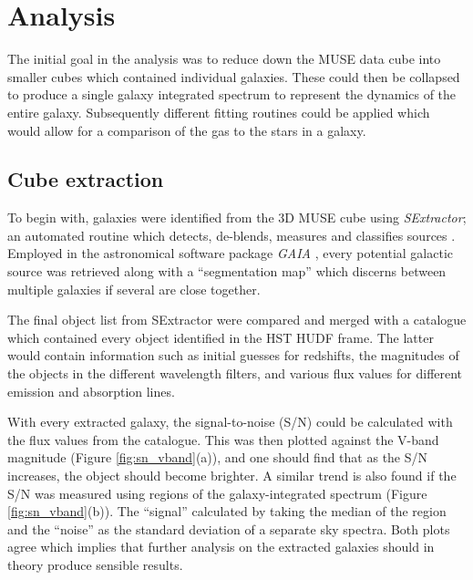 \documentclass[12pt, twocolumn]{revtex4-1}    %
\begin{document}

\section*{Analysis} 
\label{sec:analysis}

The initial goal in the analysis was to reduce down the MUSE data cube into smaller cubes which contained individual galaxies. These could then be collapsed to produce a single galaxy integrated spectrum to represent the dynamics of the entire galaxy. Subsequently different fitting routines could be applied which would allow for a comparison of the gas to the stars in a galaxy.

\subsection*{Cube extraction}

To begin with, galaxies were identified from the 3D MUSE cube using \textit{SExtractor}; an automated routine which detects, de-blends, measures and classifies sources \citep{bertin_sextractor}. Employed in the astronomical software package \textit{GAIA} \citep{currie_starlink}, every potential galactic source was retrieved along with a ``segmentation map'' which discerns between multiple galaxies if several are close together. 

The final object list from SExtractor were compared and merged with a catalogue which contained every object identified in the HST HUDF frame. The latter would contain information such as initial guesses for redshifts, the magnitudes of the objects in the different wavelength filters, and various flux values for different emission and absorption lines.


With every extracted galaxy, the signal-to-noise (S/N) could be calculated with the flux values from the catalogue. This was then plotted against the V-band magnitude (Figure \ref{fig:sn_vband}(a)), and one should find that as the S/N increases, the object should become brighter. A similar trend is also found if the S/N was measured using regions of the galaxy-integrated spectrum (Figure \ref{fig:sn_vband}(b)). The ``signal'' calculated by taking the median of the region and the ``noise'' as the standard deviation of a separate sky spectra. Both plots agree which implies that further analysis on the extracted galaxies should in theory produce sensible results. 
\end{document}
